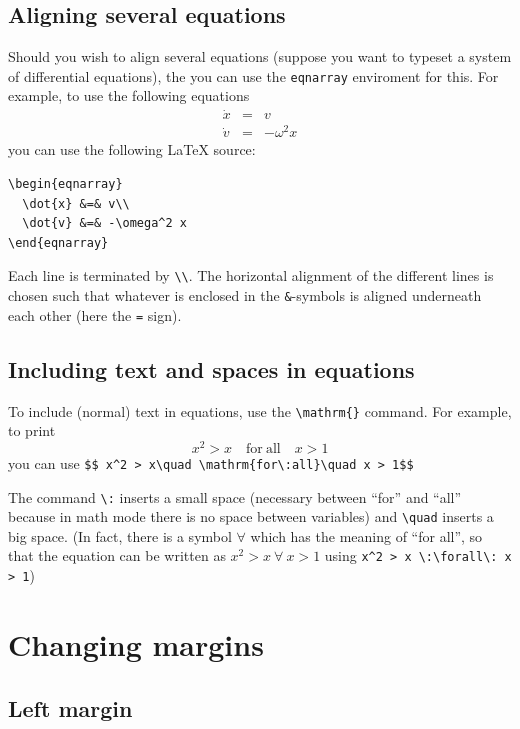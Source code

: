\documentclass[12pt,a4paper]{article}
\begin{document}
\subsection{Aligning several equations}

Should you wish to align several equations (suppose you want to
typeset a system of differential equations), the you can use the
\verb:eqnarray: enviroment for this. For example, to use the following
equations
\begin{eqnarray}
  \dot{x} &=& v\\
  \dot{v} &=& -\omega^2 x
\end{eqnarray}
you can use the following \LaTeX{} source:
\begin{verbatim}
\begin{eqnarray}
  \dot{x} &=& v\\
  \dot{v} &=& -\omega^2 x
\end{eqnarray}
\end{verbatim}

Each line is terminated by \verb:\\:. The horizontal alignment of the
different lines is chosen such that whatever is enclosed in the
\verb:&:-symbols is aligned underneath each other (here the \verb:=:
sign).


\subsection{Including text and spaces in equations}

To include (normal) text in equations, use the \verb:\mathrm{}:
command. For example, to print
$$ x^2 > x\quad \mathrm{for\:all}\quad x > 1$$
you can use \verb!$$ x^2 > x\quad \mathrm{for\:all}\quad x > 1$$!

The command \verb!\:! inserts a small space (necessary between ``for''
and ``all'' because in math mode there is no space between variables)
and \verb:\quad: inserts a big space. {\footnotesize (In fact, there
  is a symbol $\forall$ which has the meaning of ``for all'', so that
  the equation can be written as $ x^2 > x \:\forall\: x > 1$ using
  \verb!x^2 > x \:\forall\: x > 1!)}

\section{Changing margins}


\subsection{Left margin}
\end{document}
